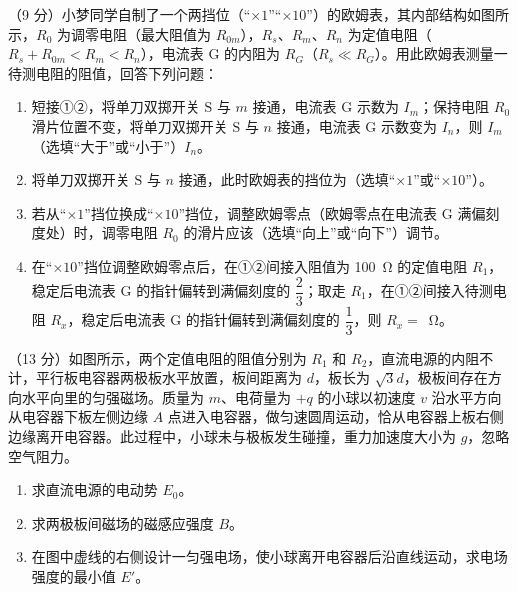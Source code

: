 \begin{question}
（9 分）小梦同学自制了一个两挡位（“$\times 1$”“$\times 10$”）的欧姆表，其内部结构如图所示，$R_{0}$ 为调零电阻（最大阻值为 $R_{0m}$），$R_{s}$、$R_{m}$、$R_{n}$ 为定值电阻（$R_{s}+R_{0m}<R_{m}<R_{n}$），电流表 $\mathrm{G}$ 的内阻为 $R_{G}$（$R_{s}\ll R_{G}$）。用此欧姆表测量一待测电阻的阻值，回答下列问题：


\begin{enumerate}[leftmargin=2em, label=(\arabic*)]
  \item 短接①②，将单刀双掷开关 $\mathrm{S}$ 与 $m$ 接通，电流表 $\mathrm{G}$ 示数为 $I_{m}$；保持电阻 $R_{0}$ 滑片位置不变，将单刀双掷开关 $\mathrm{S}$ 与 $n$ 接通，电流表 $\mathrm{G}$ 示数变为 $I_{n}$，则 $I_{m}$\gkblank（选填“大于”或“小于”）$I_{n}$。
  \item 将单刀双掷开关 $\mathrm{S}$ 与 $n$ 接通，此时欧姆表的挡位为\gkblank（选填“$\times 1$”或“$\times 10$”）。
  \item 若从“$\times 1$”挡位换成“$\times 10$”挡位，调整欧姆零点（欧姆零点在电流表 $\mathrm{G}$ 满偏刻度处）时，调零电阻 $R_{0}$ 的滑片应该\gkblank（选填“向上”或“向下”）调节。
  \item 在“$\times 10$”挡位调整欧姆零点后，在①②间接入阻值为 \SI{100}{\ohm} 的定值电阻 $R_{1}$，稳定后电流表 $\mathrm{G}$ 的指针偏转到满偏刻度的 $\dfrac{2}{3}$；取走 $R_{1}$，在①②间接入待测电阻 $R_{x}$，稳定后电流表 $\mathrm{G}$ 的指针偏转到满偏刻度的 $\dfrac{1}{3}$，则 $R_{x}=$\gkblank~\si{\ohm}。
\end{enumerate}
\end{question}

\begin{question}
（13 分）如图所示，两个定值电阻的阻值分别为 $R_{1}$ 和 $R_{2}$，直流电源的内阻不计，平行板电容器两极板水平放置，板间距离为 $d$，板长为 $\sqrt{3}d$，极板间存在方向水平向里的匀强磁场。质量为 $m$、电荷量为 $+q$ 的小球以初速度 $v$ 沿水平方向从电容器下板左侧边缘 $A$ 点进入电容器，做匀速圆周运动，恰从电容器上板右侧边缘离开电容器。此过程中，小球未与极板发生碰撞，重力加速度大小为 $g$，忽略空气阻力。


\begin{enumerate}[leftmargin=2em, label=(\arabic*)]
  \item 求直流电源的电动势 $E_{0}$。
  \item 求两极板间磁场的磁感应强度 $B$。
  \item 在图中虚线的右侧设计一匀强电场，使小球离开电容器后沿直线运动，求电场强度的最小值 $E'$。
\end{enumerate}
\end{question}

